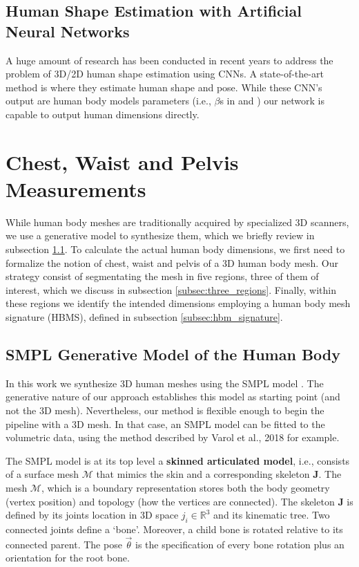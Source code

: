 \documentclass[runningheads, orivec]{llncs}
\begin{document}
\subsection{Human Shape Estimation with Artificial Neural Networks}
A huge amount of research has been conducted in recent years to address the 
problem of 3D/2D human shape estimation using CNNs. A state-of-the-art method 
is \cite{kanazawaHMR18} where they estimate human 
shape and pose. While these CNN's output are human body models parameters 
(i.e., $\beta$s in \cite{Dibra.2016a} and \cite{varol18_bodynet}) our network 
is 
capable to output human dimensions directly.

\section{Chest, Waist and Pelvis Measurements}\label{sec:approach}
While human body 
meshes are traditionally acquired by specialized 3D scanners, we use a 
generative model to synthesize them, which we briefly review in 
subsection \ref{subsec:smpl_model}. To calculate the actual human body 
dimensions, we first need to formalize the 
notion of chest, waist and pelvis of a 3D human body mesh. Our strategy consist 
of segmentating the mesh in five regions, 
three of them of interest, which we 
discuss in subsection \ref{subsec:three_regions}. Finally, within these regions 
we identify the intended dimensions employing a human body mesh signature 
(HBMS), 
defined in subsection \ref{subsec:hbm_signature}.

\subsection{SMPL Generative Model of the Human Body}\label{subsec:smpl_model}
In this work we synthesize 3D human meshes using the SMPL
model \cite{Loper.2015}. The generative nature of our approach establishes this 
model as starting point (and not the 3D mesh). Nevertheless, our method is 
flexible enough to begin the pipeline with a 3D mesh. In that case, an SMPL 
model can be fitted to the volumetric data, using the method described by 
Varol et al., 2018 \cite{varol18_bodynet} for example.

The SMPL model is at its top level a \textbf{skinned articulated 
model}, i.e., 
consists of a 
surface mesh $\mathcal{M}$ that mimics the skin and a corresponding skeleton 
$\mathbf{J}$. The mesh $\mathcal{M}$, which is a boundary 
representation stores 
both the body geometry (vertex position) and topology (how the vertices are 
connected). The skeleton $\mathbf{J}$ is defined by its joints location in 3D 
space $j_i \in \mathbb{R}^3$  and its kinematic tree. Two 
connected 
joints define a `bone'. Moreover, a child bone is rotated relative to 
its 
connected parent. The pose $\vec{\theta}$ is the specification of every bone 
rotation plus an orientation for the root bone.
\end{document}
